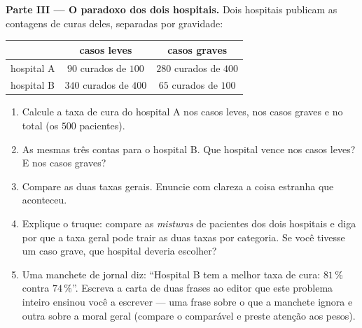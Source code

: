 \begin{problem}
\medskip
\noindent\textbf{Parte III --- O paradoxo dos dois hospitais.}
Dois hospitais publicam as contagens de curas deles, separadas por
gravidade:
\begin{center}
\renewcommand{\arraystretch}{1.3}
\begin{tabular}{l|cc}
 & casos leves & casos graves \\
\hline
hospital A & $90$ curados de $100$ & $280$ curados de $400$ \\
hospital B & $340$ curados de $400$ & $65$ curados de $100$ \\
\end{tabular}
\end{center}
\begin{enumerate}[resume]
  \item Calcule a taxa de cura do hospital A nos casos leves, nos casos
        graves e no total (os $500$ pacientes).
  \item As mesmas três contas para o hospital B. Que hospital vence nos
        casos leves? E nos casos graves?
  \item Compare as duas taxas gerais. Enuncie com clareza a coisa
        estranha que aconteceu.
  \item Explique o truque: compare as \emph{misturas} de pacientes dos
        dois hospitais e diga por que a taxa geral pode trair as duas
        taxas por categoria. Se você tivesse um caso grave, que
        hospital deveria escolher?
  \item Uma manchete de jornal diz: ``Hospital B tem a melhor taxa de
        cura: $81\,\%$ contra $74\,\%$''. Escreva a carta de duas
        frases ao editor que este problema inteiro ensinou você a
        escrever --- uma frase sobre o que a manchete ignora e outra
        sobre a moral geral (compare o comparável e preste atenção aos
        pesos).
\end{enumerate}
\end{problem}
